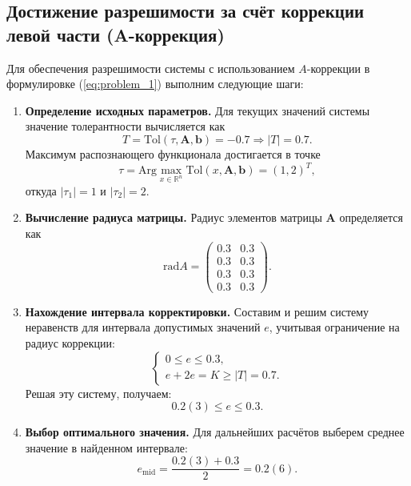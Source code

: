 \documentclass{article}
\begin{document}
    \subsection{Достижение разрешимости за счёт коррекции левой части (A-коррекция)}

    Для обеспечения разрешимости системы с использованием \( A \)-коррекции в формулировке (\ref{eq:problem_1}) выполним следующие шаги:
    
    \begin{enumerate}
      \item \textbf{Определение исходных параметров.} Для текущих значений системы значение толерантности вычисляется как 
      \[
      T = \text{Tol}(\tau, \mathbf{A}, \mathbf{b}) = -0.7 \Rightarrow |T| = 0.7.
      \]
      Максимум распознающего функционала достигается в точке 
      \[
      \tau = \text{Arg} \max_{x \in \mathbb{R}^n} \text{Tol}(x, \mathbf{A}, \mathbf{b}) = (1, 2)^T,
      \]
      откуда \( |\tau_1| = 1 \) и \( |\tau_2| = 2 \).
      
      \item \textbf{Вычисление радиуса матрицы.} Радиус элементов матрицы \(\mathbf{A}\) определяется как 
      \[
      \text{rad} A = \begin{pmatrix}
          0.3 & 0.3 \\
          0.3 & 0.3 \\
          0.3 & 0.3 \\
          0.3 & 0.3
      \end{pmatrix}.
      \]
    
      \item \textbf{Нахождение интервала корректировки.} Составим и решим систему неравенств для интервала допустимых значений \( e \), учитывая ограничение на радиус коррекции:
      \[
      \begin{cases}
        0 \leqslant e \leqslant 0.3, \\
        e + 2e = K \geqslant |T| = 0.7.
      \end{cases}
      \]
      Решая эту систему, получаем:
      \[
      0.2(3) \leqslant e \leqslant 0.3.
      \]
    
      \item \textbf{Выбор оптимального значения.} Для дальнейших расчётов выберем среднее значение в найденном интервале:
      \[
      e_{\text{mid}} = \frac{0.2(3) + 0.3}{2} = 0.2(6).
      \]
    

\end{enumerate}
\end{document}
